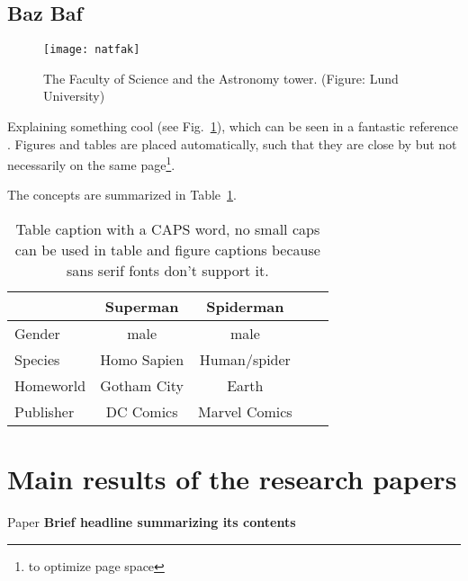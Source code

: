 \documentclass[11pt]{book}
\begin{document}
\subsection{Baz Baf\label{sec:mainresults}}
\begin{figure}
\texttt{[image: natfak]}
\caption{The Faculty of Science and the Astronomy tower. (Figure: Lund University)\label{fig:cool}}
\end{figure}

Explaining something cool (see Fig.~\ref{fig:cool}), which can be seen in a fantastic reference 
\citep{Nobody06}. Figures and tables are placed automatically, such that they are
close by but not necessarily on the same page\footnote{to optimize page space}.


The concepts are summarized in Table~\ref{tab:comparison}.
\begin{table}
\caption{Table caption with a CAPS word, no small caps can be used in table and figure captions because sans serif fonts don't support it.\label{tab:comparison}}
\centering
\begin{tabular}{lcccc}
\toprule
& Superman & Spiderman\\
\midrule
Gender & male & male\\
Species 	& Homo Sapien 	& Human/spider\\
Homeworld 	& Gotham City 	& Earth\\
\midrule
Publisher 	& DC Comics 	& Marvel Comics\\
\bottomrule
\end{tabular}
\end{table}

\section{Main results of the research papers}

\blindtext

\begin{thesisbox}{Paper \I}
\textbf{Brief headline summarizing its contents}
\\[0.3em]
\blindtext
\end{thesisbox}



\renewcommand{\bibname}{References}

\end{document}
